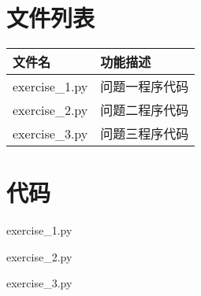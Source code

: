 \documentclass[withoutpreface,bwprint]{cumcmthesis}
\begin{document}
\newpage
\begin{appendices}
\section{文件列表}
\begin{table}[H]
\centering
\begin{tabularx}{\textwidth}{LL}
\toprule
文件名   & 功能描述 \\
\midrule
 exercise\_1.py & 问题一程序代码 \\
 exercise\_2.py & 问题二程序代码 \\
 exercise\_3.py & 问题三程序代码 \\

\bottomrule
\end{tabularx}
\label{tab:文件列表}
\end{table}

\section{代码}
\noindent 
 exercise\_1.py

exercise\_2.py

exercise\_3.py
 


\end{appendices}
\end{document}
